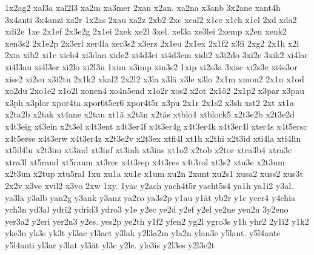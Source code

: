 {    1x2ag2
    xal3a
    xal2l3
    xa2m
    xa3mer
    2xan
    x2an.
    xa2na
    x3anb
    3x2ane
    xant4h
    3x4anti
    3x4anzi
    xa2r
    1x2as
    2xau
    xa2z
    2xb2
    2xc
    xcal2
    x1ce
    x1ch
    x1cl
    2xd
    xda2
    xdi2e
    1xe
    2x1ef
    2x3e2g
    2x1ei
    2xek
    xe2l
    3xel.
    xel3a
    xe3lei
    2xemp
    x2en
    xenk2
    xen3s2
    2x1e2p
    2x3erl
    xer4la
    xer3s2
    x3erz
    2x1eu
    2x1ex
    2x1f2
    x3fi
    2xg2
    2x1h
    x2i
    2xia
    xib2
    xi1c
    xich4
    xi3dan
    xide2
    xi4d3ei
    xi4d3em
    xidi2
    x3i2do
    3xi2e
    3xik2
    xi4lar
    xi4l3au
    xi4l3er
    xi2lo
    xi2l3u
    1xim
    x3imp
    xin3s2
    1xip
    xi2s3a
    3xisc
    xi2s3e
    xi4s3or
    xiss2
    xi2su
    x3i2tu
    2x1k2
    xkal2
    2x2l2
    x3la
    x3lä
    x3le
    x3lo
    2x1m
    xmon2
    2x1n
    x1od
    xo2du
    2xo1e2
    x1o2l
    xonen4
    xo4n5end
    x1o2r
    xos2
    x2ot
    2x1ö2
    2x1p2
    x3par
    x3pau
    x3ph
    x3plor
    xpor4ta
    xpor6t5er6
    xpor4t5r
    x3pu
    2x1r
    2x1s2
    x3sh
    xst2
    2xt
    xt1a
    x2ta2b
    x2tak
    xt4ane
    x2tau
    xt1ä
    x2tän
    x2täs
    xtblo4
    xtblock5
    x2t3e2b
    x2t3e2d
    x4t3eig
    xt3ein
    x2t3el
    x4t3ent
    x4t3er4f
    x4t3er4g
    x4t3er4k
    x4t3er4l
    xter4s
    x4t5ersc
    x4t5erse
    x4t3erw
    x4t3er4z
    x2t3e2v
    x2t3ex
    xtfi4l
    xt1h
    x2thi
    x2t3id
    xti4la
    xti4lin
    xt5il4lu
    x2t3im
    xt3ind
    xt3inf
    xt3inh
    xt3ins
    xt1o2
    x2tob
    x2tor
    xtra3b4
    xtra3c
    xtra3l
    xt5rand
    xt5raum
    xt3rec
    x4t3rep
    x4t3res
    x4t3rol
    xt3s2
    xtu3e
    x2t3um
    x2t3un
    x2tup
    xtu5ral
    1xu
    xu1a
    xu1e
    x1um
    xu2n
    2xunt
    xu2s1
    xusa2
    xuss2
    xus3t
    2x2v
    x3ve
    xvil2
    x3vo
    2xw
    1xy.
    1yac
    y2ach
    yach4t5r
    yacht5s4
    ya1h
    ya1i2
    y3al.
    ya3la
    y3alb
    yan2g
    y3ank
    y3anz
    ya2ro
    ya3s2p
    y1au
    y1ät
    yb2r
    y1c
    ycer4
    y4chia
    ych3n
    yd3al
    ydri2
    ydrid3
    ydro3
    y1e
    y2ec
    ye2d
    y2ef
    y2el
    ye2ne
    yen2n
    3y2eno
    yer3a2
    y2eri
    yer2n3
    y2es.
    yes2p
    ye2th
    y1f2
    yfen2
    yg2l
    ygro3s
    y1h
    yhr2
    2y1i2
    y1k2
    yke3n
    yk3s
    yk3t
    yl3ac
    yl3aet
    y3lak
    y2l3a2m
    yla2n
    ylan3e
    y5lant.
    y5l4ante
    y5l4anti
    yl3ar
    y3lat
    yl3ät
    yl3c
    y2le.
    yle3is
    y2l3es
    y2l3e2t
}
